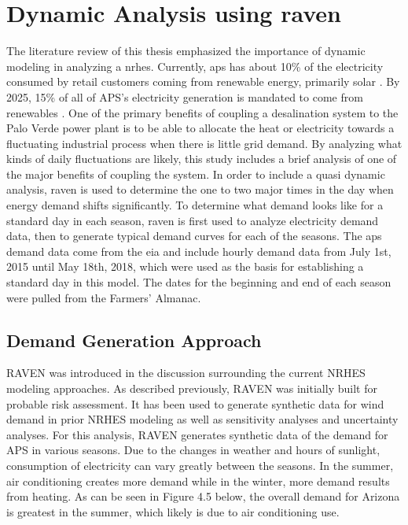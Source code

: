 \section{Dynamic Analysis using \ac{raven}}


The literature review of this thesis emphasized the importance of dynamic modeling in analyzing a \ac{nrhes}. Currently, \ac{aps} has about 10\% of the electricity consumed by retail customers coming from renewable energy, primarily solar \cite{ArizonaPublicService2018}.  By 2025, 15\% of all of APS's electricity generation is mandated to come from renewables \cite{UtilitiesDivision}.  One of the primary benefits of coupling a desalination system to the Palo Verde power plant is to be able to allocate the heat or electricity towards a fluctuating industrial process when there is little grid demand. By analyzing what kinds of daily fluctuations are likely, this study includes a brief analysis of one of the major benefits of coupling the system. In order to include a quasi dynamic analysis, \ac{raven} is used to determine the one to two major times in the day when energy demand shifts significantly. To determine what demand looks like for a standard day in each season, \ac{raven} is first used to analyze electricity demand data, then to generate typical demand curves for each of the seasons. The \ac{aps} demand data come from the \ac{eia} and include hourly demand data from July 1st, 2015 until May 18th, 2018, which were used as the basis for establishing a standard day in this model.  The dates for the beginning and end of each season were pulled from the Farmers' Almanac\cite{Almanac}.

\subsection{Demand Generation Approach}
RAVEN was introduced in the discussion surrounding the current NRHES modeling approaches.  As described previously, RAVEN was initially built for probable risk assessment.  It has been used to generate synthetic data for wind demand in prior NRHES modeling as well as sensitivity analyses and uncertainty analyses.  For this analysis, RAVEN generates synthetic data of the demand for APS in various seasons.  Due to the changes in weather and hours of sunlight, consumption of electricity can vary greatly between the seasons.  In the summer, air conditioning creates more demand while in the winter, more demand results from heating.  As can be seen in Figure 4.5 below, the overall demand for Arizona is greatest in the summer, which likely is due to air conditioning use.

